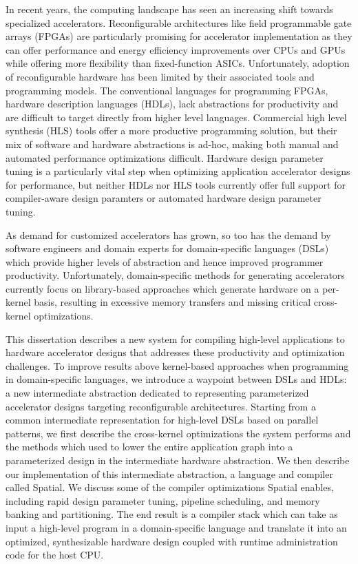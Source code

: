 In recent years, the computing landscape has seen an increasing shift towards
specialized accelerators. Reconfigurable architectures like field programmable
gate arrays (FPGAs) are particularly promising for accelerator implementation
as they can offer performance and energy efficiency improvements over CPUs
and GPUs while offering more flexibility than fixed-function ASICs.
Unfortunately, adoption of reconfigurable
hardware has been limited by their associated tools and programming models.
The conventional languages for programming FPGAs, hardware description languages (HDLs),
lack abstractions for productivity and are difficult to target directly from
higher level languages.
Commercial high level synthesis (HLS) tools
offer a more productive programming solution, but
their mix of software and hardware abstractions is ad-hoc, making both manual
and automated performance optimizations difficult.
Hardware design parameter tuning is a particularly
vital step when optimizing application accelerator designs for performance, but
neither HDLs nor HLS tools currently offer full support for compiler-aware
design paramters or automated hardware design parameter tuning.

As demand for customized accelerators has grown, so too has the
demand by software engineers and domain experts for domain-specific
languages (DSLs) which provide higher levels of abstraction and hence improved
programmer productivity.
Unfortunately, domain-specific methods for generating accelerators currently
focus on library-based approaches which generate
hardware on a per-kernel basis, resulting in excessive memory transfers and
missing critical cross-kernel optimizations.

This dissertation describes a new system for compiling high-level applications to
hardware accelerator designs that addresses these productivity and optimization
challenges. To improve results above kernel-based
approaches when programming in domain-specific languages, we
introduce a waypoint between DSLs and HDLs: a new intermediate abstraction
dedicated to representing parameterized accelerator designs
targeting reconfigurable architectures.
Starting from a common intermediate
representation for high-level DSLs based on parallel patterns, we first describe
the cross-kernel optimizations the system performs and the methods which used to
lower the entire application graph into a parameterized design in the
intermediate hardware abstraction.
We then describe our implementation of
this intermediate abstraction, a language and compiler called Spatial.
We discuss some of the compiler optimizations Spatial enables,
including rapid design parameter tuning, pipeline scheduling, and
memory banking and partitioning.
The end result is a compiler stack which can take as input a high-level program in a domain-specific
language and translate it into an optimized, synthesizable hardware design coupled with
runtime administration code for the host CPU.

